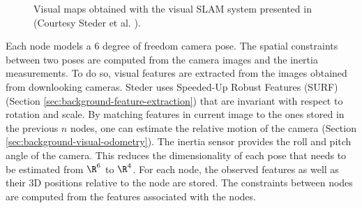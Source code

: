 \begin{figure}[htb!]
  \begin{center}
    \hspace{1cm}
   
  \end{center}
  \caption{Visual maps obtained with the visual SLAM system presented in \cite{steder2008visual} (Courtesy Steder et al. \cite{steder2008visual}).}
  \label{featureImg}
\end{figure}

Each node models a 6 degree of freedom camera pose.
The spatial constraints between two poses are computed from the camera images and the inertia measurements.
To do so, visual features are extracted from the images obtained from downlooking cameras.
Steder uses Speeded-Up Robust Features (SURF) (Section \ref{sec:background-feature-extraction}) that are invariant with respect to rotation and scale.
By matching features in current image to the ones stored in the previous $n$ nodes, one can estimate the relative motion of the camera (Section \ref{sec:background-visual-odometry}).
The inertia sensor provides the roll and pitch angle of the camera.
This reduces the dimensionality of each pose that needs to be estimated from $\R^6$ to $\R^4$.
For each node, the observed features as well as their 3D positions relative to the node are stored.
The constraints between nodes are computed from the features associated with the nodes.

